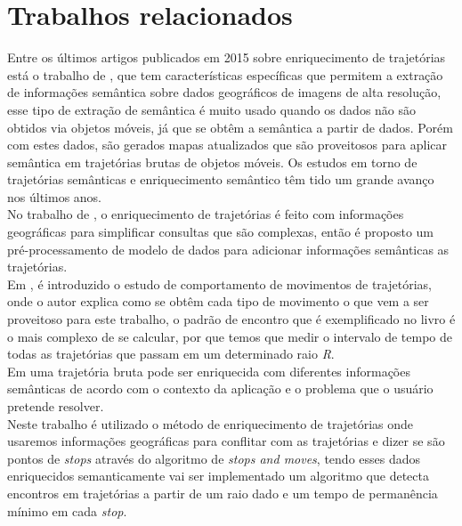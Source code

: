 \documentclass[	12pt, Times, openright, twoside, a4paper, english, brazil]{abntex2}
\begin{document}
  \chapter{Trabalhos relacionados}
    Entre os últimos artigos publicados em 2015 sobre enriquecimento de trajetórias está o trabalho de \cite{sublime2015}, que tem características específicas que permitem a extração de informações semântica sobre dados geográficos de imagens de alta resolução, esse tipo de extração de semântica é muito usado quando os dados não são obtidos via objetos móveis, já que se obtêm a semântica a partir de dados. Porém com estes dados, são gerados mapas atualizados que são proveitosos para aplicar semântica em trajetórias brutas de objetos móveis. Os estudos em torno de trajetórias semânticas e enriquecimento semântico têm tido um grande avanço nos últimos anos.\\
    \indent No trabalho de \cite{alvares2007}, o enriquecimento de trajetórias é feito com informações geográficas para simplificar consultas que são complexas, então é proposto um pré-processamento de modelo de dados para adicionar informações semânticas as trajetórias.\\
    \indent Em \cite{laube2005finding}, é introduzido o estudo de comportamento de movimentos de trajetórias, onde o autor explica como se obtêm cada tipo de movimento o que vem a ser proveitoso para este trabalho, o padrão de encontro que é exemplificado no livro é o mais complexo de se calcular, por que temos que medir o intervalo de tempo de todas as trajetórias que passam em um determinado raio \textit{R}.\\
    \indent Em \cite{Bogorny2012} uma trajetória bruta pode ser enriquecida com diferentes informações semânticas de acordo com o contexto da aplicação e o problema que o usuário pretende resolver.\\
    \indent Neste trabalho é utilizado o método de enriquecimento de trajetórias onde usaremos informações geográficas para conflitar com as trajetórias e dizer se são pontos de \textit{stops} através do algoritmo de \textit{stops and moves}, tendo esses dados enriquecidos semanticamente vai ser implementado um algoritmo que detecta encontros em trajetórias a partir de um raio dado e um tempo de permanência mínimo em cada \textit{stop}.
  
\end{document}
